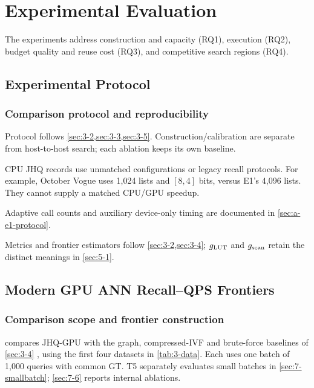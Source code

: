 \chapter{Experimental Evaluation}
\label{ch:evaluation}

The experiments address construction and capacity (RQ1), execution (RQ2),
budget quality and reuse cost (RQ3), and competitive search regions (RQ4).

\section{Experimental Protocol}
\label{sec:7-1}

\subsection{Comparison protocol and reproducibility}

Protocol follows \cref{sec:3-2,sec:3-3,sec:3-5}. Construction/calibration are separate from host-to-host search; each ablation keeps its own baseline.

CPU JHQ records use unmatched configurations or legacy recall protocols. For example, October Vogue uses 1,024 lists and $[8,4]$ bits, versus E1's 4,096 lists. They cannot supply a matched CPU/GPU speedup.

Adaptive call counts and auxiliary device-only timing are documented in
\cref{sec:a-e1-protocol}.

Metrics and frontier estimators follow \cref{sec:3-2,sec:3-4};
$g_{\mathrm{LUT}}$ and $g_{\mathrm{scan}}$ retain the distinct meanings in \cref{sec:5-1}.





\section{Modern GPU ANN Recall--QPS Frontiers}
\label{sec:7-2}

\subsection{Comparison scope and frontier construction}

 compares JHQ-GPU with the graph, compressed-IVF
and brute-force baselines of \cref{sec:3-4} \cite{cagra,pq,ivfrabitq},
using the first four datasets in \cref{tab:3-data}. Each uses one batch
of 1,000 queries with common GT. T5 separately evaluates small batches
in \cref{sec:7-smallbatch}; \cref{sec:7-6} reports internal ablations.


